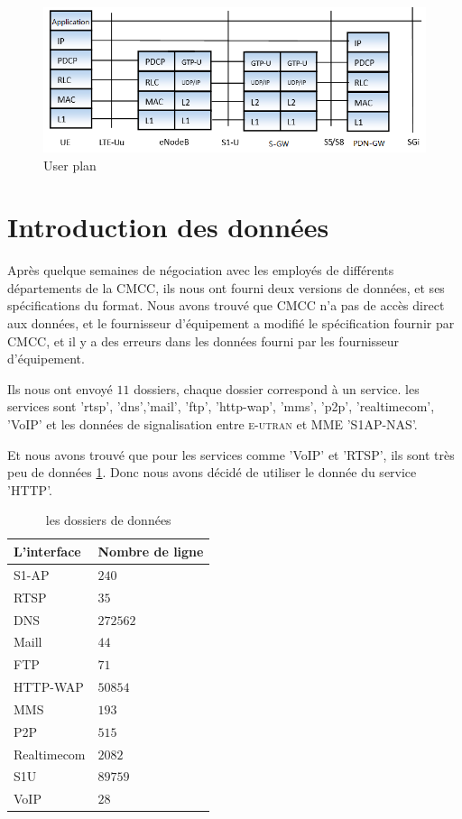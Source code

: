 \begin{figure}[H]
\centering
\includegraphics[width=0.9\linewidth]{images/S1-U}
\caption{User plan}
\label{fig:S1-U}
\end{figure}

\section{Introduction des données}
Après quelque semaines de négociation avec les employés de différents départements de la CMCC, ils nous ont fourni deux versions de données, et ses spécifications du format\cite{specifi}. Nous avons trouvé que CMCC n'a pas de accès direct aux données, et le fournisseur d'équipement a modifié le spécification fournir par CMCC, et il y a des erreurs dans les données fourni par les fournisseur d'équipement.

Ils nous ont envoyé $11$ dossiers, chaque dossier correspond à un service. les services sont 'rtsp', 'dns','mail', 'ftp', 'http-wap', 'mms', 'p2p', 'realtimecom', 'VoIP' et les données de signalisation entre \textsc{e-utran} et MME 'S1AP-NAS'.
    
Et nous avons trouvé que pour les services comme 'VoIP' et 'RTSP', ils sont très peu de données \ref{table.nombre}. Donc nous avons décidé de utiliser le donnée du service 'HTTP'.

\begin{table}[H]
\centering
	\begin{tabular}{|>{\centering\arraybackslash}p{4 cm}|>{\centering\arraybackslash}p{4 cm}|}
	\hline \textsf{L'interface }& \textsf{Nombre de ligne} \\ 
	\hline S1-AP & $240$ \\ 
	\hline RTSP &$ 35$ \\ 
	\hline DNS  & $272562$ \\ 
	\hline Maill & $44$ \\ 
	\hline FTP &$ 71$ \\ 
	\hline HTTP-WAP & $50854$ \\ 
	\hline MMS & $193$ \\ 
	\hline P2P & $515$ \\ 
	\hline Realtimecom & $2082$ \\ 
	\hline S1U &$ 89759$ \\ 
	\hline VoIP & $28$ \\ 
	\hline 
	\end{tabular} 
	\caption{les dossiers de données}
	          \label{table.nombre}
\end{table}


